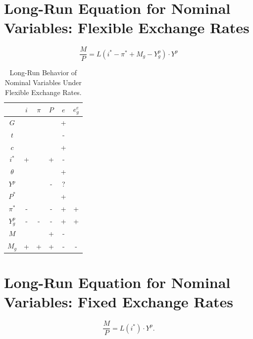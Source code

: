 \documentclass[
  letterpaper,
]{book}
\theoremstyle{plain}
\theoremstyle{remark}
\begin{document}
\section{Long-Run Equation for Nominal Variables: Flexible Exchange Rates}

\[
\frac{M}{P}=L(i^*-\pi^*+M_g-Y_g^p)\cdot Y^p
\]

\begin{table}

\begin{tabular}
{*{6}{|c}|}
\hline

    &$i$    &$\pi$  &$P$    &$e$    &$e_g^e$\\ \hline
$G$ &   &   &   &+  &       \\ \hline
$t$ &   &   &   &-  &       \\ \hline
$c$ &   &   &   &+  &       \\ \hline
$i^*$   &+  &   &+  &-  &       \\ \hline
$\theta$    &   &   &   &+  &   \\ \hline
$Y^p$   &   &   &-  &?  &       \\ \hline
$P^*$   &   &   &   &+  &       \\ \hline
$\pi^*$ &-  &   &-  &+  &+      \\ \hline
$Y^p_g$ &-  &-  &-  &+  &+      \\ \hline
$M$ &   &   &+  &-  &       \\ \hline
$M_g$   &+  &+  &+  &-  &-      \\ \hline

\end{tabular}
\caption{Long-Run Behavior of Nominal Variables Under Flexible Exchange Rates.}
\end{table}

\section{Long-Run Equation for Nominal Variables: Fixed Exchange Rates}

\[
\frac{M}{P}=L(i^*)\cdot Y^p.
\]
\end{document}
